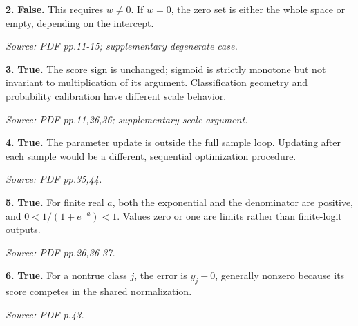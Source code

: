 \documentclass[11pt,a4paper]{article}
\begin{document}
\par\noindent\begin{minipage}{\linewidth}
\textbf{2.} \textbf{False.} This requires \(w\ne0\). If \(w=0\), the zero set is either the whole space or empty, depending on the intercept.

{\footnotesize\textit{Source: PDF pp.11-15; supplementary degenerate case.}}
\end{minipage}\par\vspace{3mm}
\par\noindent\begin{minipage}{\linewidth}
\textbf{3.} \textbf{True.} The score sign is unchanged; sigmoid is strictly monotone but not invariant to multiplication of its argument. Classification geometry and probability calibration have different scale behavior.

{\footnotesize\textit{Source: PDF pp.11,26,36; supplementary scale argument.}}
\end{minipage}\par\vspace{3mm}
\par\noindent\begin{minipage}{\linewidth}
\textbf{4.} \textbf{True.} The parameter update is outside the full sample loop. Updating after each sample would be a different, sequential optimization procedure.

{\footnotesize\textit{Source: PDF pp.35,44.}}
\end{minipage}\par\vspace{3mm}
\par\noindent\begin{minipage}{\linewidth}
\textbf{5.} \textbf{True.} For finite real \(a\), both the exponential and the denominator are positive, and \(0<1/(1+e^{-a})<1\). Values zero or one are limits rather than finite-logit outputs.

{\footnotesize\textit{Source: PDF pp.26,36-37.}}
\end{minipage}\par\vspace{3mm}
\par\noindent\begin{minipage}{\linewidth}
\textbf{6.} \textbf{True.} For a nontrue class \(j\), the error is \(y_j-0\), generally nonzero because its score competes in the shared normalization.

{\footnotesize\textit{Source: PDF p.43.}}
\end{minipage}\par\vspace{3mm}
\end{document}
